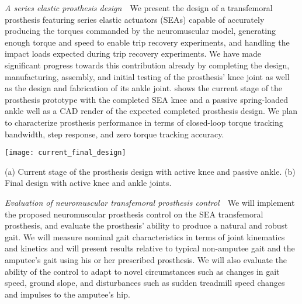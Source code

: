 \begin{contributions}
    \item\label{contrib:pros_design} \emph{A series elastic prosthesis
    design}~~We present the design of a transfemoral prosthesis featuring series
    elastic actuators (SEAs) capable of accurately producing the torques
    commanded by the neuromuscular model, generating enough torque and speed to
    enable trip recovery experiments, and handling the impact loads expected
    during trip recovery experiments. We have made significant progress towards
    this contribution already by completing the design, manufacturing, assembly,
    and initial testing of the prosthesis' knee joint as well as the design and
    fabrication of its ankle joint.   shows the
    current stage of the prosthesis prototype with the completed SEA knee and a
    passive spring-loaded ankle well as a CAD render of the expected completed
    prosthesis design. We plan to characterize prosthesis performance in terms
    of closed-loop torque tracking bandwidth, step response, and zero torque
    tracking accuracy.
    \begin{marginfigure}[1in]
        \centering
        \texttt{[image: current\_final\_design]}
        \caption{(a) Current stage of the prosthesis design with active knee and
        passive ankle. (b) Final design with active knee and ankle joints.}
        \label{fig:prosthesis_design}
    \end{marginfigure}

    \item\label{contrib:neuromuc_eval} \emph{Evaluation of neuromuscular
    transfemoral prosthesis control}~~We will implement the proposed
    neuromuscular prosthesis control on the SEA transfemoral prosthesis, and
    evaluate the prosthesis' ability to produce a natural and robust gait. We
    will measure nominal gait characteristics in terms of joint kinematics and
    kinetics and will present results relative to typical non-amputee gait and
    the amputee's gait using his or her prescribed prosthesis. We will also
    evaluate the ability of the control to adapt to novel circumstances such as
    changes in gait speed, ground slope, and disturbances such as sudden
    treadmill speed changes and impulses to the amputee's hip.


\end{contributions}
